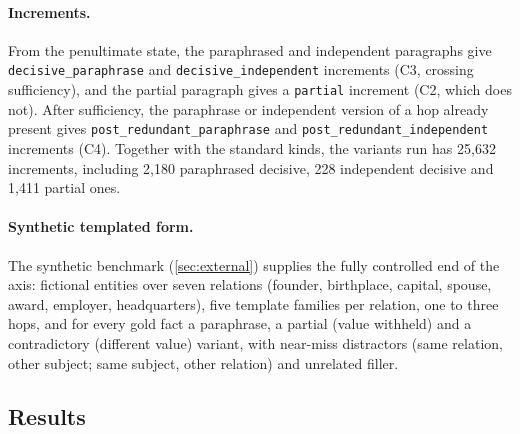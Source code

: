 \paragraph{Increments.} From the penultimate state, the paraphrased and independent paragraphs give \texttt{decisive\_paraphrase} and \texttt{decisive\_independent} increments (C3, crossing sufficiency), and the partial paragraph gives a \texttt{partial} increment (C2, which does not). After sufficiency, the paraphrase or independent version of a hop already present gives \texttt{post\_redundant\_paraphrase} and \texttt{post\_redundant\_independent} increments (C4). Together with the standard kinds, the variants run has 25{,}632 increments, including 2{,}180 paraphrased decisive, 228 independent decisive and 1{,}411 partial ones.

\paragraph{Synthetic templated form.} The synthetic benchmark (\cref{sec:external}) supplies the fully controlled end of the axis: fictional entities over seven relations (founder, birthplace, capital, spouse, award, employer, headquarters), five template families per relation, one to three hops, and for every gold fact a paraphrase, a partial (value withheld) and a contradictory (different value) variant, with near-miss distractors (same relation, other subject; same subject, other relation) and unrelated filler.

\subsection{Results}
\label{app:estb-results}

\begin{table}[h]
\centering\scriptsize
\setlength{\tabcolsep}{2.5pt}
\resizebox{\linewidth}{!}{}
\caption{Retrieval-source and linguistic-form axes (Qwen2.5-7B, \musique{} 2-hop). Within-run probes on the document split, except the two fully retrieved runs (question split, too few questions for document components). \musique{} direction: transfer without retraining, scored only on questions outside the source probe's training split. Answered rate: the insufficient prompt unpatched, with the full sufficient anchor, and with only the probe-direction component; and the sufficient prompt with $\vdm$ projected to its insufficient value.}
\label{tab:estb}
\end{table}

